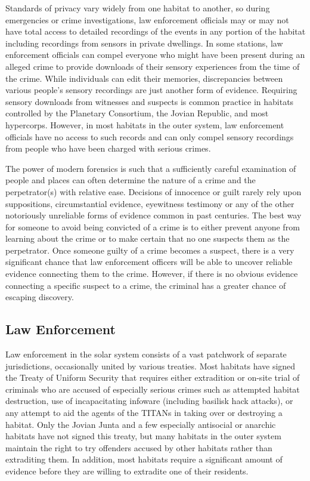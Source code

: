 Standards of privacy vary widely from one habitat 
to another, so during emergencies or crime investigations, law enforcement officials may or may not 
have total access to detailed recordings of the events 
in any portion of the habitat including recordings 
from sensors in private dwellings. In some stations, 
law enforcement officials can compel everyone who 
might have been present during an alleged crime to 
provide downloads of their sensory experiences from 
the time of the crime. While individuals can edit their 
memories, discrepancies between various people's 
sensory recordings are just another form of evidence. 
Requiring sensory downloads from witnesses and 
suspects is common practice in habitats controlled 
by the Planetary Consortium, the Jovian Republic, 
and most hypercorps. However, in most habitats in 
the outer system, law enforcement officials have no 
access to such records and can only compel sensory 
recordings from people who have been charged with 
serious crimes.

The power of modern forensics is such that a sufficiently careful examination of people and places 
can often determine the nature of a crime and the 
perpetrator(s) with relative ease. Decisions of innocence or guilt rarely rely upon suppositions, circumstantial evidence, eyewitness testimony or any of 
the other notoriously unreliable forms of evidence 
common in past centuries. The best way for someone to avoid being convicted of a crime is to either 
prevent anyone from learning about the crime or 
to make certain that no one suspects them as the 
perpetrator. Once someone guilty of a crime becomes 
a suspect, there is a very significant chance that law 
enforcement officers will be able to uncover reliable 
evidence connecting them to the crime. However, if 
there is no obvious evidence connecting a specific 
suspect to a crime, the criminal has a greater chance 
of escaping discovery.

\subsection{Law Enforcement}

Law enforcement in the solar system consists of a 
vast patchwork of separate jurisdictions, occasionally 
united by various treaties. Most habitats have signed 
the Treaty of Uniform Security that requires either extradition or on-site trial of criminals who are accused 
of especially serious crimes such as attempted habitat 
destruction, use of incapacitating infoware (including 
basilisk hack attacks), or any attempt to aid the agents 
of the TITANs in taking over or destroying a habitat. 
Only the Jovian Junta and a few especially antisocial 
or anarchic habitats have not signed this treaty, but 
many habitats in the outer system maintain the right 
to try offenders accused by other habitats rather than 
extraditing them. In addition, most habitats require a 
significant amount of evidence before they are willing 
to extradite one of their residents.


